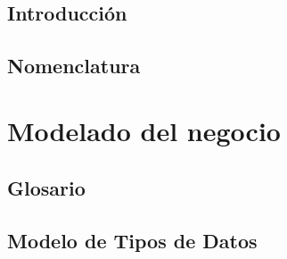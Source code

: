 \documentclass[10pt]{book}
\author{Escuela Superior de Cómputo del IPN}
\title{\varProyecto}
\subtitle {\varCveDocumento--\varDocumento}
\begin{document}
        \thispagestyle{empty}
        \maketitle
        
        \makeDocInfo
        \bigskip\\
        \makeObservaciones[3cm]
        \vspace{2cm}
        \makeFirmas
        
        \frontmatter
        \tableofcontents
        \listoffigures
        \mainmatter
        
        
        \chapter{Introducción}
        \label{ch:introduccion}
        
        
        \chapter{Nomenclatura}
        \label{ch:nomenclatura}
        
        
        
        \part{Modelado del negocio}
        \label{ch:modeloNegocio}
        
        \chapter{Glosario}
        \label{ch:glosario}
        
        
        \chapter{Modelo de Tipos de Datos}
        \label{ch:tipos}
        
        
\end{document}
